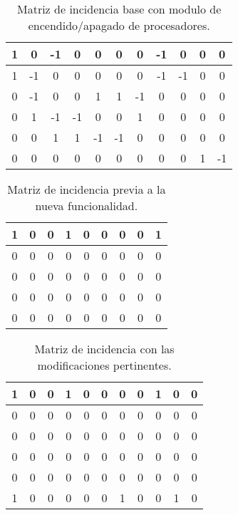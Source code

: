 \begin{table}[H]
    \centering
    \begin{tabular}{|c|c|c|c|c|c|c|c|c|c|c|}
        \hline
        1 & 0 & -1 & 0 & 0 & 0 & 0 & -1 & 0 & 0 & 0 \\
        \hline
        1 & -1 & 0 & 0 & 0 & 0 & 0 & -1 & -1 & 0 & 0 \\
        \hline
        0 & -1 & 0 & 0 & 1 & 1 & -1 & 0 & 0 & 0 & 0 \\
        \hline
        0 & 1 & -1 & -1 & 0 & 0 & 1 & 0 & 0 & 0 & 0 \\
        \hline
        0 & 0 & 1 & 1 & -1 & -1 & 0 & 0 & 0 & 0 & 0 \\
        \hline
        0 & 0 & 0 & 0 & 0 & 0 & 0 & 0 & 0 & 1 & -1 \\
        \hline
    \end{tabular}
    \caption{Matriz de incidencia base con modulo de encendido/apagado de procesadores.}
    \label{tabla:matriz_base_post}
\end{table}

\begin{table}[H]
    \centering
    \begin{tabular}{|c|c|c|c|c|c|c|c|c|}
        \hline
        1 & 0 & 0 & 1 & 0 & 0 & 0 & 0 & 1 \\
        \hline
        0 & 0 & 0 & 0 & 0 & 0 & 0 & 0 & 0 \\
        \hline
        0 & 0 & 0 & 0 & 0 & 0 & 0 & 0 & 0 \\
        \hline
        0 & 0 & 0 & 0 & 0 & 0 & 0 & 0 & 0 \\
        \hline
        0 & 0 & 0 & 0 & 0 & 0 & 0 & 0 & 0 \\
        \hline
    \end{tabular}
    \caption{Matriz de incidencia previa a la nueva funcionalidad.}
    \label{tabla:matriz_incidencia_pre}
\end{table}

\begin{table}[H]
    \centering
    \begin{tabular}{|c|c|c|c|c|c|c|c|c|c|c|}
        \hline
        1 & 0 & 0 & 1 & 0 & 0 & 0 & 0 & 1 & 0 & 0 \\
        \hline
        0 & 0 & 0 & 0 & 0 & 0 & 0 & 0 & 0 & 0 & 0 \\
        \hline
        0 & 0 & 0 & 0 & 0 & 0 & 0 & 0 & 0 & 0 & 0 \\
        \hline
        0 & 0 & 0 & 0 & 0 & 0 & 0 & 0 & 0 & 0 & 0 \\
        \hline
        0 & 0 & 0 & 0 & 0 & 0 & 0 & 0 & 0 & 0 & 0 \\
        \hline
        1 & 0 & 0 & 0 & 0 & 0 & 1 & 0 & 0 & 1 & 0 \\
        \hline
    \end{tabular}
    \caption{Matriz de incidencia con las modificaciones pertinentes.}
    \label{tabla:matriz_incidencia_post}
\end{table}


